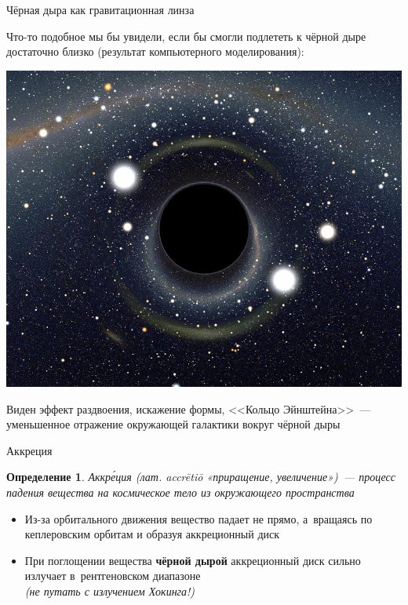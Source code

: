\documentclass[usenames,dvipsnames,pdftex,unicode,hidelinks]{beamer}
\newtheorem{ru-def}{Определение}
\renewenvironment{definition}{\begin{ru-def}}{\end{ru-def}}
\begin{document}
  \begin{frame}{Чёрная дыра как гравитационная линза}

    {
      \footnotesize
      Что-то подобное мы бы увидели, если бы смогли подлететь к чёрной дыре достаточно
      близко (результат компьютерного моделирования):
      \begin{center}
        \includegraphics[height=0.6\textheight]{black-hole}
      \end{center}
      Виден эффект раздвоения, искажение формы, <<Кольцо Эйнштейна>>~---
      уменьшенное отражение окружающей галактики вокруг чёрной дыры
    }
  \end{frame}

  \begin{frame}{Аккреция}
    \begin{definition}
      \alert{Аккр\'{е}ция} (лат. accr\={e}ti\={o} «приращение, увеличение»)~--- процесс падения
      вещества на космическое тело из окружающего пространства
    \end{definition}

    \begin{itemize}
      \item Из-за орбитального движения вещество падает не прямо, а~вращаясь по кеплеровским
        орбитам и образуя \alert{аккреционный диск}
      \item<2-> При поглощении вещества \textbf{чёрной дырой} аккреционный диск сильно \alert{излучает}
        в~рентгеновском диапазоне\\ \emph{(не путать с излучением Хокинга!)}
    \end{itemize}
  \end{frame}
\end{document}
